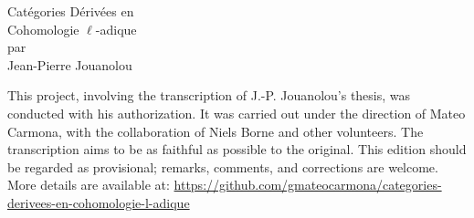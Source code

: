 \documentclass[12pt,twoside]{report} %
\begin{document}
\setcounter{tocdepth}{2}
\sloppy


\thispagestyle{empty}
\noindent\makebox[\linewidth]{\rule{4in}{0.01in}}
\vspace*{\fill}
\begin{center}
    {\Huge Catégories Dérivées en} \\
    \vspace{0.5em}
    {\Huge Cohomologie $\ell$-adique} \\
    \vspace{0.5em}
    {\Large par} \\
    \vspace{0.5em}
    {\huge Jean-Pierre Jouanolou}
\end{center}
\vspace*{\fill}
\noindent\makebox[\linewidth]{\rule{4in}{0.01in}}

\newpage 
\thispagestyle{empty}

\null\vfill
\noindent\begin{minipage}{\textwidth}
This project, involving the transcription of J.-P. Jouanolou's thesis, was conducted with his authorization. It was carried out under the direction of Mateo Carmona, with the collaboration of Niels Borne and other volunteers. The transcription aims to be as faithful as possible to the original. This edition should be regarded as provisional; remarks, comments, and corrections are welcome. More details are available at: \url{https://github.com/gmateocarmona/categories-derivees-en-cohomologie-l-adique}
\end{minipage}

\newpage
\end{document}
